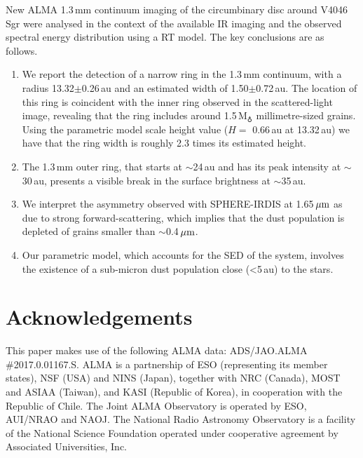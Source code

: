 \documentclass[letters,usenatbib,times]{mnras}
\begin{document}
New ALMA 1.3\,mm continuum imaging of the circumbinary disc around V4046\,Sgr were analysed in the context of the available IR imaging and the observed spectral energy distribution using a RT model. The key conclusions are as follows.
\begin{enumerate}
  \item We report the detection of a narrow ring in the 1.3\,mm continuum, with a radius 13.32$\pm$0.26\,au and an estimated width of 1.50$\pm$0.72\,au. The location of this ring is coincident with the inner ring observed in the scattered-light image, revealing that the ring includes around 1.5\,M$_{\earth}$ millimetre-sized grains. Using the parametric model scale height value ($H= $ 0.66\,au at 13.32\,au) we have that the ring width is roughly 2.3 times its estimated height.
  
  \item The 1.3\,mm outer ring, that starts at $\sim$24\,au and has its peak intensity at $\sim$30\,au, presents a visible break in the surface brightness at $\sim$35\,au. 
  
  \item We interpret the asymmetry observed with SPHERE-IRDIS at 1.65\,$\hbox{$\mu$m}$ as due to strong forward-scattering, which implies that the dust population is depleted of grains smaller than $\sim$0.4\,$\hbox{$\mu$m}$.
  
  \item Our parametric model, which accounts for the SED of the system, involves the existence of a sub-micron dust population close (<5\,au) to the stars. 
\end{enumerate}



 \section*{Acknowledgements}

This paper makes use of the following ALMA data: ADS/JAO.ALMA \#2017.0.01167.S. ALMA is a partnership of ESO (representing its member states), NSF (USA) and NINS (Japan), together with NRC (Canada), MOST and ASIAA (Taiwan), and KASI (Republic of Korea), in cooperation with the Republic of Chile. The Joint ALMA Observatory is operated by ESO, AUI/NRAO and NAOJ. The National Radio Astronomy Observatory is a facility of the National Science Foundation operated under cooperative agreement by Associated Universities, Inc.
 
\end{document}
